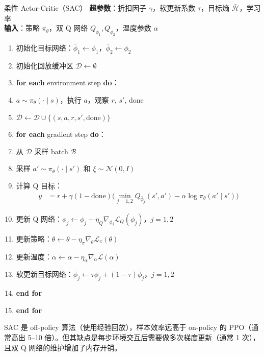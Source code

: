 \begin{myalgorithm}{柔性 Actor-Critic（SAC）}
\textbf{超参数}：折扣因子 $\gamma$，软更新系数 $\tau$，目标熵 $\bar{\mathcal{H}}$，学习率\\
\textbf{输入}：策略 $\pi_\theta$，双 Q 网络 $Q_{\phi_1}, Q_{\phi_2}$，温度参数 $\alpha$
\begin{enumerate}
    \item 初始化目标网络：$\bar{\phi}_1 \leftarrow \phi_1$，$\bar{\phi}_2 \leftarrow \phi_2$
    \item 初始化回放缓冲区 $\mathcal{D} \leftarrow \emptyset$
    \item \textbf{for each} environment step \textbf{do}：
    \item \quad $a \sim \pi_\theta(\cdot \mid s)$，执行 $a$，观察 $r$, $s'$, done
    \item \quad $\mathcal{D} \leftarrow \mathcal{D} \cup \{(s, a, r, s', \text{done})\}$
    \item \quad \textbf{for each} gradient step \textbf{do}：
    \item \quad \quad 从 $\mathcal{D}$ 采样 batch $\mathcal{B}$
    \item \quad \quad 采样 $a' \sim \pi_\theta(\cdot \mid s')$ 和 $\xi \sim \mathcal{N}(0,I)$
    \item \quad \quad 计算 Q 目标：
    \begin{align*}
    y &= r + \gamma(1-\text{done}) \big( \min_{j=1,2} Q_{\bar{\phi}_j}(s', a') - \alpha \log \pi_\theta(a' \mid s') \big)
    \end{align*}
    \item \quad \quad 更新 Q 网络：$\phi_j \leftarrow \phi_j - \eta_Q \nabla_{\phi_j} \mathcal{L}_Q(\phi_j)$，$j=1,2$
    \item \quad \quad 更新策略：$\theta \leftarrow \theta - \eta_\pi \nabla_\theta \mathcal{L}_\pi(\theta)$
    \item \quad \quad 更新温度：$\alpha \leftarrow \alpha - \eta_\alpha \nabla_\alpha \mathcal{L}(\alpha)$
    \item \quad \quad 软更新目标网络：$\bar{\phi}_j \leftarrow \tau \phi_j + (1-\tau) \bar{\phi}_j$，$j=1,2$
    \item \quad \textbf{end for}
    \item \textbf{end for}
\end{enumerate}
\end{myalgorithm}

\begin{remark}
SAC 是 off-policy 算法（使用经验回放），样本效率远高于 on-policy 的 PPO（通常高出 5--10 倍）。但其缺点是每步环境交互后需要做多次梯度更新（通常 1 次），且双 Q 网络的维护增加了内存开销。
\end{remark}

